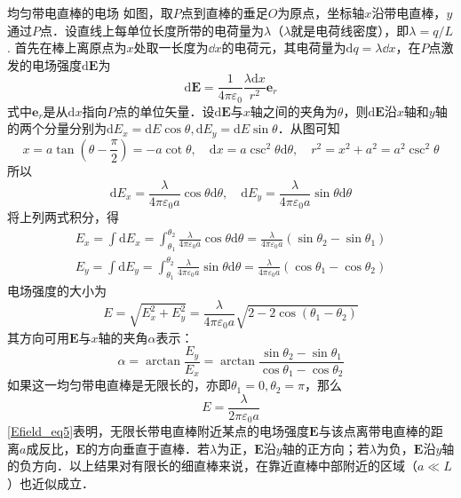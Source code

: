 \begin{example}{均匀带电直棒的电场}
如图，取$P$点到直棒的垂足$O$为原点，坐标轴$x$沿带电直棒，$y$通过$P$点．设直线上每单位长度所带的电荷量为$\lambda$（$\lambda$就是电荷线密度），即$\lambda=q/L$. 首先在棒上离原点为$x$处取一长度为$\dd{x}$的电荷元，其电荷量为$\mathrm dq=\lambda\dd{x}$，在$P$点激发的电场强度$\mathrm d\mathbf E$为
\begin{equation}
\mathrm{d} \mathbf{E}=\frac{1}{4 \pi \varepsilon_{0}} \frac{\lambda \mathrm{d} x}{r^{2}} \mathbf e_r
\end{equation}
式中$\mathbf e_r$是从$\mathrm dx$指向$P$点的单位矢量．设$\mathrm{d} \mathbf{E}$与$x$轴之间的夹角为$\theta$，则$\mathrm{d} \mathbf{E}$沿$x$轴和$y$轴的两个分量分别为$\mathrm{d} E_{x}=\mathrm{d} E \cos \theta, \mathrm{d} E_{y}=\mathrm{d} E \sin \theta$．从图可知
\begin{equation}
x=a \tan \left(\theta-\frac{\pi}{2}\right)=-a \cot \theta, \quad \mathrm{d} x=a \csc ^{2} \theta \mathrm{d} \theta, \quad r^{2}=x^{2}+a^{2}=a^{2} \csc ^{2} \theta
\end{equation}
所以
\begin{equation}
\mathrm{d} E_{x}=\frac{\lambda}{4 \pi \varepsilon_{0} a} \cos \theta \mathrm{d} \theta, \quad \mathrm{d} E_{y}=\frac{\lambda}{4 \pi \varepsilon_{0} a} \sin \theta \mathrm{d} \theta
\end{equation}
将上列两式积分，得
\begin{equation}
\begin{aligned}E_{x}=\int \mathrm{d} E_{x}=\int_{\theta_{1}}^{\theta_{2}} \frac{\lambda}{4 \pi \varepsilon_{0} a} \cos \theta \mathrm{d} \theta=\frac{\lambda}{4 \pi \varepsilon_{0} a}\left(\sin \theta_{2}-\sin \theta_{1}\right) \\ E_{y}=\int \mathrm{d} E_{y}=\int_{\theta_{1}}^{\theta_{2}} \frac{\lambda}{4 \pi \varepsilon_{0} a} \sin \theta \mathrm{d} \theta=\frac{\lambda}{4 \pi \varepsilon_{0} a}\left(\cos \theta_{1}-\cos \theta_{2}\right)\end{aligned}
\end{equation}
电场强度的大小为
\begin{equation}
E=\sqrt{E_{x}^{2}+E_{y}^{2}}=\frac{\lambda}{4 \pi \varepsilon_{0} a} \sqrt{2-2 \cos \left(\theta_{1}-\theta_{2}\right)}
\end{equation}
其方向可用$\mathbf E$与$x$轴的夹角$\alpha$表示：
\begin{equation}
\alpha=\arctan \frac{E_{y}}{E_{x}}=\arctan \frac{\sin \theta_{2}-\sin \theta_{1}}{\cos \theta_{1}-\cos \theta_{2}}
\end{equation}
如果这一均匀带电直棒是无限长的，亦即$\theta_{1}=0, \theta_{2}=\pi$，那么
\begin{equation} \label{Efield_eq5}
E=\frac{\lambda}{2 \pi \varepsilon_{0} a}
\end{equation}
\autoref{Efield_eq5}表明，无限长带电直棒附近某点的电场强度$\mathbf E$与该点离带电直棒的距离$a$成反比，$\mathbf  E$的方向垂直于直棒．若$\lambda$为正，$\mathbf E$沿$y$轴的正方向；若$\lambda$为负，$\mathbf E$沿$y$轴的负方向．以上结果对有限长的细直棒来说，在靠近直棒中部附近的区域（$a\ll L$）也近似成立．
\end{example}


